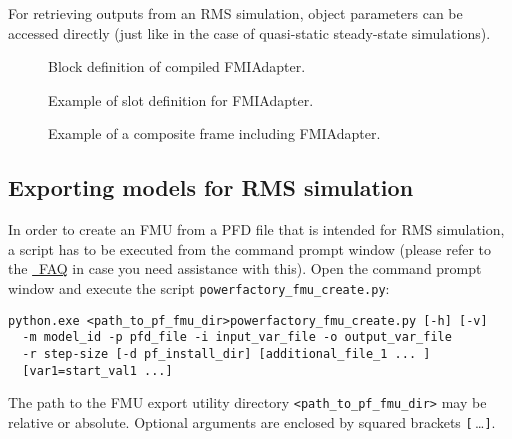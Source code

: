 For retrieving outputs from an RMS simulation, object parameters can be accessed directly (just like in the case of quasi-static steady-state simulations).


\begin{figure}[h!]
\vspace*{1em}
\caption{Block definition of compiled \dslmodel FMIAdapter.}
\label{fig:fmiadapter_model_definition}
\end{figure}

\begin{figure}[h!]
\vspace*{1em}
\caption{Example of slot definition for \dslmodel FMIAdapter.}
\label{fig:fmiadapter_slot}
\end{figure}

\clearpage

\begin{figure}[h!]
\vspace*{2em}
\caption{Example of a composite frame including \dslmodel FMIAdapter.}
\label{fig:fmiadapterconfig_composite_frame}
\end{figure}


\subsection{Exporting models for RMS simulation}

In order to create an FMU from a PFD file that is intended for RMS simulation, a \python script has to be executed from the command prompt window (please refer to the \href{https://docs.python.org/2/faq/windows.html}{\python~FAQ} in case you need assistance with this).
Open the command prompt window and execute the script \texttt{powerfactory\_fmu\_create.py}:

\begin{verbatim}
python.exe <path_to_pf_fmu_dir>powerfactory_fmu_create.py [-h] [-v] 
  -m model_id -p pfd_file -i input_var_file -o output_var_file
  -r step-size [-d pf_install_dir] [additional_file_1 ... ]
  [var1=start_val1 ...]
\end{verbatim}

The path to the \fmipp \pf FMU export utility directory \verb!<path_to_pf_fmu_dir>! may be relative or absolute.
Optional arguments are enclosed by squared brackets \verb![!$\,$\ldots\verb!]!.
  

